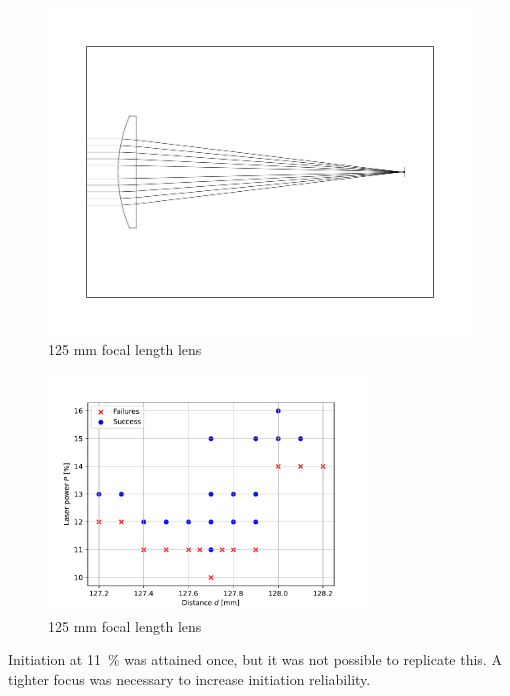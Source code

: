                 \begin{figure}[!ht]
                    \centering
                    \includegraphics[width=\textwidth]{assets/4 experiments/125lens.pdf}
                    \caption{125 mm focal length lens}
                \end{figure}
    
                \begin{figure}[!ht]
                    \centering
                    \includegraphics[width=0.75\textwidth]{assets/4 experiments/125mm_focus_threshold.pdf}
                    \caption{125 mm focal length lens}
                \end{figure}
                
                Initiation at \qty{11}{\%} was attained once, but it was not possible to replicate this. A tighter focus was necessary to increase initiation reliability.
    
